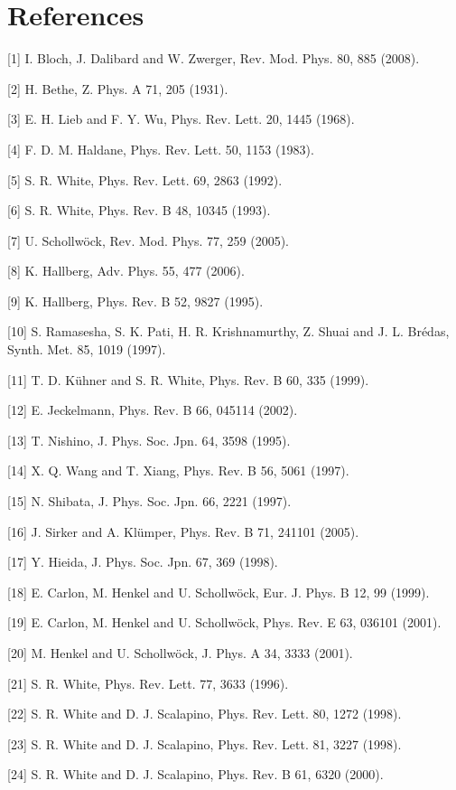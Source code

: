 \documentclass[12pt]{article}
\begin{document}
\section*{References}
[1] I. Bloch, J. Dalibard and W. Zwerger, Rev. Mod. Phys. 80, 885 (2008).

[2] H. Bethe, Z. Phys. A 71, 205 (1931).

[3] E. H. Lieb and F. Y. Wu, Phys. Rev. Lett. 20, 1445 (1968).

[4] F. D. M. Haldane, Phys. Rev. Lett. 50, 1153 (1983).

[5] S. R. White, Phys. Rev. Lett. 69, 2863 (1992).

[6] S. R. White, Phys. Rev. B 48, 10345 (1993).

[7] U. Schollwöck, Rev. Mod. Phys. 77, 259 (2005).

[8] K. Hallberg, Adv. Phys. 55, 477 (2006).

[9] K. Hallberg, Phys. Rev. B 52, 9827 (1995).

[10] S. Ramasesha, S. K. Pati, H. R. Krishnamurthy, Z. Shuai and J. L. Brédas, Synth. Met. 85, 1019 (1997).

[11] T. D. Kühner and S. R. White, Phys. Rev. B 60, 335 (1999).

[12] E. Jeckelmann, Phys. Rev. B 66, 045114 (2002).

[13] T. Nishino, J. Phys. Soc. Jpn. 64, 3598 (1995).

[14] X. Q. Wang and T. Xiang, Phys. Rev. B 56, 5061 (1997).

[15] N. Shibata, J. Phys. Soc. Jpn. 66, 2221 (1997).

[16] J. Sirker and A. Klümper, Phys. Rev. B 71, 241101 (2005).

[17] Y. Hieida, J. Phys. Soc. Jpn. 67, 369 (1998).

[18] E. Carlon, M. Henkel and U. Schollwöck, Eur. J. Phys. B 12, 99 (1999).

[19] E. Carlon, M. Henkel and U. Schollwöck, Phys. Rev. E 63, 036101 (2001).

[20] M. Henkel and U. Schollwöck, J. Phys. A 34, 3333 (2001).

[21] S. R. White, Phys. Rev. Lett. 77, 3633 (1996).

[22] S. R. White and D. J. Scalapino, Phys. Rev. Lett. 80, 1272 (1998).

[23] S. R. White and D. J. Scalapino, Phys. Rev. Lett. 81, 3227 (1998).

[24] S. R. White and D. J. Scalapino, Phys. Rev. B 61, 6320 (2000).
\end{document}
